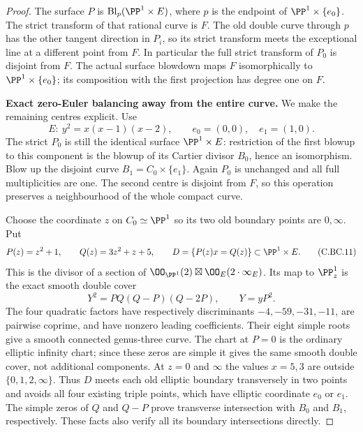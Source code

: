 \begin{proof}
The surface \(P\) is \(\operatorname{Bl}_p(\PP^1\times E)\),
where \(p\) is the endpoint of
\(\PP^1\times\{e_0\}\). The strict transform of that
rational curve is \(F\). The old double curve through
\(p\) has the other tangent direction in \(P_i\), so
its strict transform meets the exceptional line at a
different point from \(F\). In particular the full
strict transform of \(P_0\) is disjoint from \(F\).
The actual surface blowdown maps \(F\) isomorphically
to \(\PP^1\times\{e_0\}\); its composition with
the first projection has degree one on \(F\).

\par\medskip\noindent\textbf{Exact zero-Euler balancing away from the entire curve.}
We make the remaining centres explicit. Use
\[
 E:\ y^2=x(x-1)(x-2),\qquad e_0=(0,0),\quad e_1=(1,0).
                                                               \tag{C.BC.10}
\]
The strict \(P_0\) is still the identical surface
\(\PP^1\times E\): restriction of the first blowup
to this component is the blowup of its Cartier divisor
\(B_0\), hence an isomorphism. Blow up the disjoint
curve \(B_1=C_0\times\{e_1\}\). Again \(P_0\)
is unchanged and all full multiplicities are one.
The second centre is disjoint from \(F\), so this
operation preserves a neighbourhood of the whole
compact curve.

Choose the coordinate \(z\) on \(C_0\simeq\PP^1\)
so its two old boundary points are \(0,\infty\). Put
\[
 P(z)=z^2+1,\qquad Q(z)=3z^2+z+5,\qquad
 D=\{P(z)x=Q(z)\}\subset\PP^1\times E .
                                                               \tag{C.BC.11}
\]
This is the divisor of a section of
\(\OO_{\PP^1}(2)\boxtimes\OO_E(2\cdot\infty_E)\).
Its map to \(\PP^1_z\) is the exact smooth double
cover
\[
          Y^2=P Q(Q-P)(Q-2P),\qquad Y=yP^2 .                  \tag{C.BC.12}
\]
The four quadratic factors have respectively discriminants
\(-4,-59,-31,-11\), are pairwise coprime, and have
nonzero leading coefficients. Their eight simple roots
give a smooth connected genus-three curve. The chart
at \(P=0\) is the ordinary elliptic infinity chart;
since these zeros are simple it gives the same smooth
double cover, not additional components. At \(z=0\)
and \(\infty\) the values \(x=5,3\) are outside
\(\{0,1,2,\infty\}\). Thus \(D\) meets each old
elliptic boundary transversely in two points and avoids
all four existing triple points, which have elliptic
coordinate \(e_0\) or \(e_1\). The simple zeros of
\(Q\) and \(Q-P\) prove transverse intersection
with \(B_0\) and \(B_1\), respectively. These facts
also verify all its boundary intersections directly.


\end{proof}
